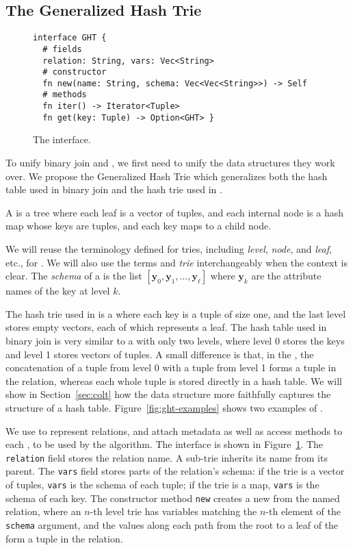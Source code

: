 \subsection{The Generalized Hash Trie}\label{sec:ght}

\begin{figure}
\begin{lstlisting}
interface GHT {
  # fields
  relation: String, vars: Vec<String>  
  # constructor
  fn new(name: String, schema: Vec<Vec<String>>) -> Self
  # methods
  fn iter() -> Iterator<Tuple>
  fn get(key: Tuple) -> Option<GHT> }
\end{lstlisting}
\caption{The \GHT interface.}
\label{fig:ght}
\end{figure}

To unify binary join and \GJ, 
  we first need to unify the data structures they work over.
We propose the Generalized Hash Trie 
  which generalizes both the hash table used in binary join 
  and the hash trie used in \GJ.

\begin{defn}
  A \GHT is a tree where each leaf is a vector of tuples, and
  each internal node is a hash map whose keys are tuples, and each key
  maps to a child node.
\end{defn}

We will reuse the terminology defined for tries, including
\emph{level}, \emph{node}, and \emph{leaf}, etc., for \GHTs.  We will
also use the terms \GHT and \emph{trie} interchangeably when the
context is clear.  The {\em schema} of a \GHT is the list
$[\bm y_0,\bm y_1, \ldots, \bm y_\ell]$ where $\bm y_k$ are the
attribute names of the key at level $k$. 

The hash trie used in \GJ is a \GHT where each key is a tuple of size one,
  and the last level stores empty vectors, each of which represents a leaf.
The hash table used in binary join is very similar to a \GHT with only two levels,
  where level 0 stores the keys and level 1 stores
  vectors of tuples.
A small difference is that, in the \GHT, the concatenation of 
  a tuple from level 0 with a tuple from level 1 forms a tuple in the relation, 
  whereas each whole tuple is stored directly in a hash table.
We will show in Section~\ref{sec:colt} how the \COLT data structure
  more faithfully captures the structure of a hash table.
Figure~\ref{fig:ght-examples} shows two examples of \GHTs.

We use \GHTs to represent relations,
  and attach metadata as well as access methods 
  to each \GHT, to be used by the \FJ algorithm.
The \GHT interface is shown in Figure~\ref{fig:ght}.
The \lstinline|relation| field stores the relation name.
A sub-trie inherits its name from its parent.
The \lstinline|vars| field stores parts of the relation's schema:
  if the trie is a vector of tuples, 
  \lstinline|vars| is the schema of each tuple;
  if the trie is a map, 
  \lstinline|vars| is the schema of each key.
The constructor method \lstinline|new| creates a new \GHT from the named relation, 
  where an $n$-th level trie has variables
  matching the $n$-th element of the \lstinline|schema| argument,
  and the values along each path from the root to a leaf of the \GHT 
  form a tuple in the relation.

